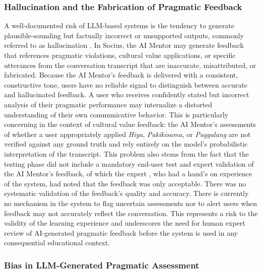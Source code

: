 \subsubsection{Hallucination and the Fabrication of Pragmatic Feedback}

A well-documented risk of LLM-based systems is the tendency to generate 
plausible-sounding but factually incorrect or unsupported outputs, commonly 
referred to as hallucination \cite{ji_survey_2023}. In Socius, the AI Mentor may generate feedback that 
references pragmatic violations, cultural value applications, or specific 
utterances from the conversation transcript that are inaccurate, 
misattributed, or fabricated. Because the AI Mentor's feedback is delivered 
with a consistent, constructive tone, users have no reliable signal to distinguish between accurate and hallucinated 
feedback. A user who receives confidently stated but incorrect analysis of 
their pragmatic performance may internalize a distorted understanding of 
their own communicative behavior. This is particularly concerning in the 
context of cultural value feedback: the AI Mentor's assessments of whether 
a user appropriately applied \textit{Hiya}, \textit{Pakikisama}, or 
\textit{Paggalang} are not verified against any ground truth and rely 
entirely on the model's probabilistic interpretation of the transcript. This problem also
stems from the fact that the testing phase did not include a mandatory end-user test and expert validation of the AI Mentor's feedback, of which the expert
, who had a hand's on experience of the system, had noted that the feedback was only acceptable. There was no systematic validation of the feedback's quality and accuracy. 
There is currently no mechanism in the system to flag uncertain assessments nor to alert users when feedback may not 
accurately reflect the conversation. This represents a risk to 
the validity of the learning experience and underscores the need for human expert review of 
AI-generated pragmatic feedback before the system is used in any consequential 
educational context.

\subsubsection{Bias in LLM-Generated Pragmatic Assessment}

